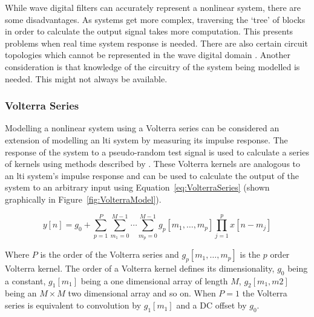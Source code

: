 			While wave digital filters can accurately represent a nonlinear system, there are some
			disadvantages. As systems get more complex, traversing the `tree' of blocks in order to calculate
			the output signal takes more computation. This presents problems when real time system response is
			needed. There are also certain circuit topologies which cannot be represented in the wave digital
			domain \citep{valimaki2011virtual}. Another consideration is that knowledge of the circuitry of the
			system being modelled is needed. This might not always be available.

		\subsubsection{Volterra Series}
			Modelling a nonlinear system using a Volterra series can be considered an extension of modelling an
			\acrshort{lti} system by measuring its impulse response. The response of the system to a
			pseudo-random test signal is used to calculate a series of kernels using methods described by
			\citet{schetzen1980the}.  These Volterra kernels are analogous to an \acrshort{lti} system's
			impulse response and can be used to calculate the output of the system to an arbitrary input using
			Equation~\ref{eq:VolterraSeries} (shown graphically in Figure~\ref{fig:VolterraModel}).

			\begin{equation}
				y[n] = g_{0} + \sum_{p = 1}^{P} 
					\sum_{m_{1} = 0}^{M - 1} \dotsi \sum_{m_{p} = 0}^{M - 1}
					g_{p}[m_{1}, \dotsc , m_{p}]
					\prod_{j = 1}^{p} x[n - m_{j}]
				\label{eq:VolterraSeries}
			\end{equation}

			Where $P$ is the order of the Volterra series and $g_{p}[m_{1}, \dotsc , m_{p}]$ is the
			$p$ order Volterra kernel. The order of a Volterra kernel defines its dimensionality,
			$g_{0}$ being a constant, $g_{1}[m_{1}]$ being a one dimensional array of length $M$, $g_{2}[m_{1},
			m{2}]$ being an $M \times M$ two dimensional array and so on. When $P = 1$ the Volterra series is
			equivalent to convolution by $g_{1}[m_{1}]$ and a DC offset by $g_{0}$.


